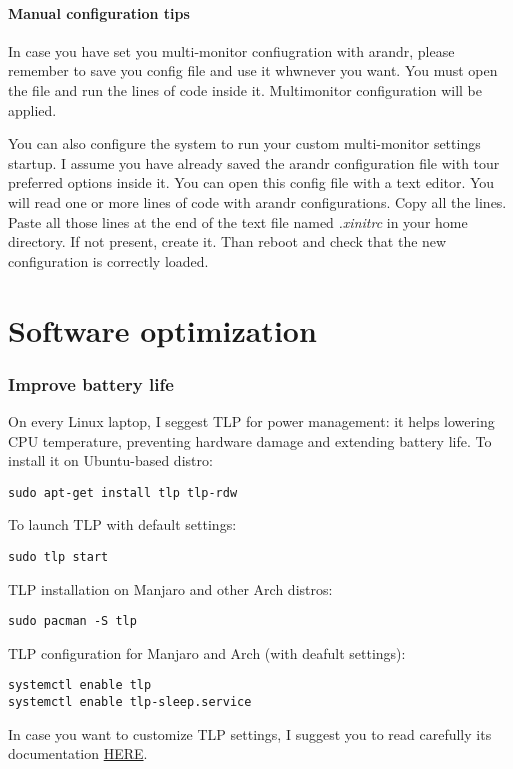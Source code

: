 \documentclass{article}
\begin{document}
\paragraph{Manual configuration tips}

In case you have set you multi-monitor confiugration with arandr, please remember to save you config file and use it whwnever you want. You must open the file and run the lines of code inside it. Multimonitor configuration will be applied.

You can also configure the system to run your custom multi-monitor settings startup. I assume you have already saved the arandr configuration file with tour preferred options inside it. You can open this config file with a text editor. You will read one or more lines of code with arandr configurations. Copy all the lines. Paste all those lines at the end of the text file named \emph{.xinitrc} in your home directory. If not present, create it. Than reboot and check that the new configuration is correctly loaded. 
 

\section{Software optimization}

\subsubsection{Improve battery life}

On every Linux laptop, I seggest TLP for power management: it helps lowering CPU temperature, preventing hardware damage and extending battery life. To install it on Ubuntu-based distro:
\begin{verbatim}
sudo apt-get install tlp tlp-rdw
\end{verbatim}
To launch TLP with default settings:
\begin{verbatim}
sudo tlp start
\end{verbatim}
TLP installation on Manjaro and other Arch distros:
\begin{verbatim}
sudo pacman -S tlp
\end{verbatim}
TLP configuration for Manjaro and Arch (with deafult settings):
\begin{verbatim}
systemctl enable tlp
systemctl enable tlp-sleep.service
\end{verbatim}
In case you want to customize TLP settings, I suggest you to read carefully its documentation \href{https://linrunner.de/en/tlp/docs/tlp-configuration.html}{HERE}.
\end{document}
